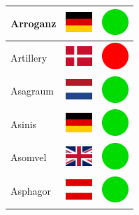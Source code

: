 \documentclass[12pt, a4paper, twoside]{report}
\begin{document}
\begin{center}
\begin{longtable}{|p{5cm}|p{2cm}|p{2cm}|}
Arroganz & \includegraphics[width=1cm]{4x3/de} & \includegraphics[width=1cm]{likes/y} \\ \hline
Artillery & \includegraphics[width=1cm]{4x3/dk} & \includegraphics[width=1cm]{likes/n} \\ \hline
Asagraum & \includegraphics[width=1cm]{4x3/nl} & \includegraphics[width=1cm]{likes/y} \\ \hline
Asinis & \includegraphics[width=1cm]{4x3/de} & \includegraphics[width=1cm]{likes/y} \\ \hline
Asomvel & \includegraphics[width=1cm]{4x3/gb} & \includegraphics[width=1cm]{likes/y} \\ \hline
Asphagor & \includegraphics[width=1cm]{4x3/at} & \includegraphics[width=1cm]{likes/y} \\ \hline

\end{longtable}
\end{center}
\end{document}
